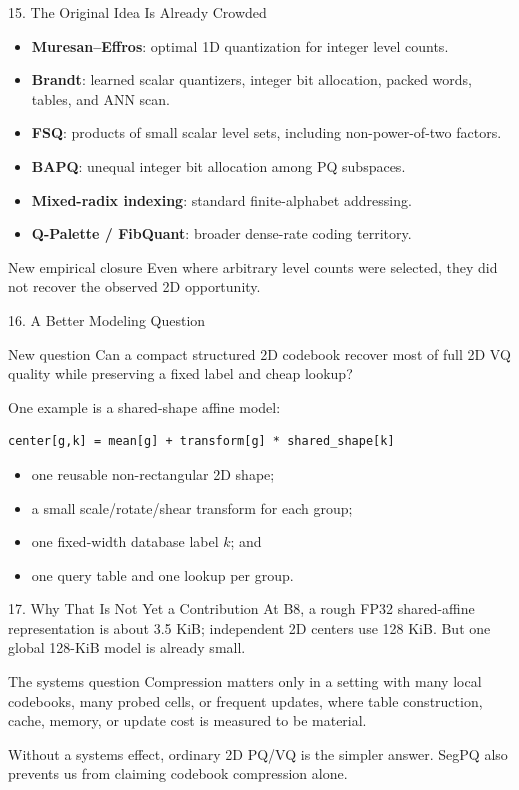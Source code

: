 \documentclass[aspectratio=169]{beamer}
\newcommand{\paper}[1]{\textbf{#1}}
\begin{document}
\begin{frame}{15. The Original Idea Is Already Crowded}
\small
\begin{itemize}
  \item \paper{Muresan--Effros}: optimal 1D quantization for integer level counts.
  \item \paper{Brandt}: learned scalar quantizers, integer bit allocation, packed words, tables, and ANN scan.
  \item \paper{FSQ}: products of small scalar level sets, including non-power-of-two factors.
  \item \paper{BAPQ}: unequal integer bit allocation among PQ subspaces.
  \item \paper{Mixed-radix indexing}: standard finite-alphabet addressing.
  \item \paper{Q-Palette / FibQuant}: broader dense-rate coding territory.
\end{itemize}
\normalsize
\begin{alertblock}{New empirical closure}
Even where arbitrary level counts were selected, they did not recover the observed 2D opportunity.
\end{alertblock}
\end{frame}

\begin{frame}[fragile]{16. A Better Modeling Question}
\begin{block}{New question}
Can a compact structured 2D codebook recover most of full 2D VQ quality while preserving a fixed label and cheap lookup?
\end{block}
One example is a shared-shape affine model:
\begin{verbatim}
center[g,k] = mean[g] + transform[g] * shared_shape[k]
\end{verbatim}
\begin{itemize}
  \item one reusable non-rectangular 2D shape;
  \item a small scale/rotate/shear transform for each group;
  \item one fixed-width database label $k$; and
  \item one query table and one lookup per group.
\end{itemize}
\end{frame}

\begin{frame}{17. Why That Is Not Yet a Contribution}
At B8, a rough FP32 shared-affine representation is about 3.5 KiB; independent 2D centers use 128 KiB.
\medskip
But one global 128-KiB model is already small.
\begin{alertblock}{The systems question}
Compression matters only in a setting with many local codebooks, many probed cells, or frequent updates, where table construction, cache, memory, or update cost is measured to be material.
\end{alertblock}
Without a systems effect, ordinary 2D PQ/VQ is the simpler answer. SegPQ also prevents us from claiming codebook compression alone.
\end{frame}
\end{document}
